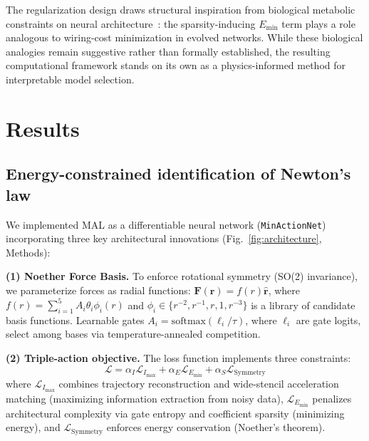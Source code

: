 \documentclass[aps,pre,reprint,superscriptaddress,longbibliography]{revtex4-2}
\begin{document}
The regularization design draws structural inspiration from biological metabolic constraints on neural architecture~\cite{Clune2013, Bullmore2012}: the sparsity-inducing $E_{\mathrm{min}}$ term plays a role analogous to wiring-cost minimization in evolved networks. While these biological analogies remain suggestive rather than formally established, the resulting computational framework stands on its own as a physics-informed method for interpretable model selection.

\section{Results}

\subsection{Energy-constrained identification of Newton's law}
We implemented MAL as a differentiable neural network (\texttt{MinActionNet}) incorporating three key architectural innovations (Fig.~\ref{fig:architecture}, Methods):

\textbf{(1) Noether Force Basis.} To enforce rotational symmetry (SO(2) invariance), we parameterize forces as radial functions: $\mathbf{F}(\mathbf{r}) = f(r)\hat{\mathbf{r}}$, where $f(r) = \sum_{i=1}^5 A_i \theta_i \phi_i(r)$ and $\phi_i \in \{r^{-2}, r^{-1}, r, 1, r^{-3}\}$ is a library of candidate basis functions. Learnable gates $A_i = \mathrm{softmax}(\ell_i/\tau)$, where $\ell_i$ are gate logits, select among bases via temperature-annealed competition.

\textbf{(2) Triple-action objective.} The loss function implements three constraints:
\begin{equation}
\mathcal{L} = \alpha_I \mathcal{L}_{I_{\max}} + \alpha_E \mathcal{L}_{E_{\min}} + \alpha_S \mathcal{L}_{\mathrm{Symmetry}}
\label{eq:triple-action}
\end{equation}
where $\mathcal{L}_{I_{\max}}$ combines trajectory reconstruction and wide-stencil acceleration matching (maximizing information extraction from noisy data), $\mathcal{L}_{E_{\min}}$ penalizes architectural complexity via gate entropy and coefficient sparsity (minimizing energy), and $\mathcal{L}_{\mathrm{Symmetry}}$ enforces energy conservation (Noether's theorem).
\end{document}
